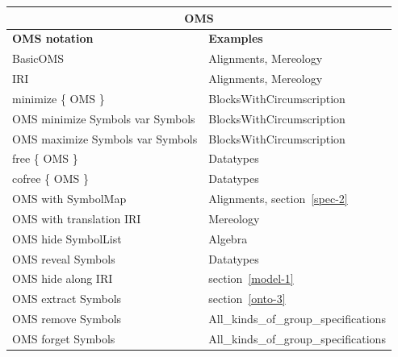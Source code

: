 \documentclass[10pt,fleqn,final]{scrreprt}
\providecommand{\DIFadd}[1]{{\protect\color{blue}\uwave{#1}}} %
\providecommand{\DIFaddbegin}{} %
\providecommand{\DIFaddend}{} %
\begin{document}
\begin{tabular}{|l|l|}\hline
\multicolumn{2}{|c|}{\textbf{OMS}}\\\hline
\textbf{OMS notation} & \textbf{Examples} \\\hline
BasicOMS  & Alignments, Mereology \\\hline
IRI  & Alignments, Mereology \\\hline
minimize \{ OMS \}  & BlocksWithCircumscription \\\hline
OMS minimize Symbols var Symbols  & BlocksWithCircumscription \\\hline
OMS maximize Symbols var Symbols  & BlocksWithCircumscription \\\hline
free \{ OMS \} & Datatypes \\\hline
cofree \{ OMS \} & Datatypes \\\hline
OMS with SymbolMap  & Alignments,  section~\ref{spec-2} \\\hline
OMS with translation IRI  & Mereology \\\hline
OMS hide SymbolList  &  Algebra \\\hline
OMS reveal Symbols  & Datatypes \\\hline
OMS hide along IRI  & section~\ref{model-1}\DIFaddbegin \DIFadd{, MetricSpaces }\DIFaddend \\\hline
OMS extract Symbols  & section~\ref{onto-3} \\\hline
OMS remove Symbols  & All\_kinds\_of\_group\_specifications \\\hline
OMS forget Symbols  & All\_kinds\_of\_group\_specifications \\\hline

\end{tabular}
\end{document}
